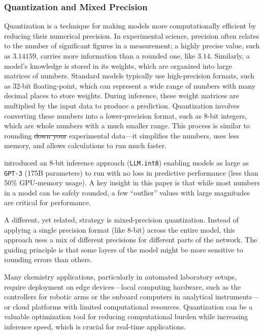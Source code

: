 \documentclass[11pt, oneside]{article}
\makeatletter
\newcommand{\modelname}[1]{\texttt{#1}}
\providecommand{\DIFdeltex}[1]{{\protect\color{red}\sout{#1}}} %
\providecommand{\DIFdelbegin}{} %
\providecommand{\DIFdelend}{} %
\providecommand{\DIFdel}[1]{\texorpdfstring{\DIFdeltex{#1}}{}} %
\newcommand{\DIFscaledelfig}{0.5}
\newlength{\DIFdelgraphicswidth} %
\newlength{\DIFdelgraphicsheight} %
\newcommand{\DIFdelincludegraphics}[2][]{%
\sbox{\DIFdelgraphicsbox}{\DIFOincludegraphics[#1]{#2}}%
\settoboxwidth{\DIFdelgraphicswidth}{\DIFdelgraphicsbox} %
\settoboxtotalheight{\DIFdelgraphicsheight}{\DIFdelgraphicsbox} %
\scalebox{\DIFscaledelfig}{%
\parbox[b]{\DIFdelgraphicswidth}{\usebox{\DIFdelgraphicsbox}\\[-\baselineskip] \rule{\DIFdelgraphicswidth}{0em}}\llap{\resizebox{\DIFdelgraphicswidth}{\DIFdelgraphicsheight}{%
\setlength{\unitlength}{\DIFdelgraphicswidth}%
\begin{picture}(1,1)%
\thicklines\linethickness{2pt} %
{\color[rgb]{1,0,0}\put(0,0){\framebox(1,1){}}}%
{\color[rgb]{1,0,0}\put(0,0){\line( 1,1){1}}}%
{\color[rgb]{1,0,0}\put(0,1){\line(1,-1){1}}}%
\end{picture}%
}\hspace*{3pt}}} %
} %
\DeclareRobustCommand{\DIFdelbegin}{\DIFOdelbegin \let\includegraphics\DIFdelincludegraphics} %
\DeclareRobustCommand{\DIFdelend}{\DIFOaddend \let\includegraphics\DIFOincludegraphics} %
\let\sout@orig\sout %
\renewcommand{\sout}[1]{\ifmmode\text{\sout@orig{\ensuremath{#1}}}\else\sout@orig{#1}\fi} %
\makeatother
\begin{document}
\subsubsection{Quantization and Mixed Precision}
\label{sec:quantization}
Quantization is a technique for making models more computationally efficient by reducing their numerical precision. 
In experimental science, precision often relates to the number of significant figures in a measurement; a highly precise value, such as $3.14159$, carries more information than a rounded one, like $3.14$. 
Similarly, a model's knowledge is stored in its weights, which are organized into large matrices of numbers. 
Standard models typically use high-precision formats, such as 32-bit floating-point, which can represent a wide range of numbers with many decimal places to store weights. During inference, these weight matrices are multiplied by the input data to produce a prediction. Quantization involves converting these numbers into a lower-precision format, such as 8-bit integers, which are whole numbers with a much smaller range. This process is similar to rounding \DIFdelbegin \DIFdel{down your }\DIFdelend experimental data---it simplifies the numbers, uses less memory, and allows calculations to run much faster.

 
\textcite{dettmers2022gpt3} introduced an 8-bit inference approach (\texttt{LLM.int8}) enabling models as large as \modelname{GPT-3} (175B parameters) to run with no loss in predictive performance (less than $50\%$ GPU-memory usage).  
A key insight in this paper is that while most numbers in a model can be safely rounded, a few \enquote{outlier} values with large magnitudes are critical for performance. 

A different, yet related, strategy is mixed-precision quantization.\autocite{micikevicius2017mixed} Instead of applying a single precision format (like 8-bit) across the entire model, this approach uses a mix of different precisions for different parts of the network. The guiding principle is that some layers of the model might be more sensitive to rounding errors than others.


Many chemistry applications, particularly in automated laboratory setups, require deployment on edge devices---local computing hardware, such as the controllers for robotic arms or the onboard computers in analytical instruments---or cloud platforms with limited computational resources. Quantization can be a valuable optimization tool for reducing computational burden while increasing inference speed, which is crucial for real-time applications.
\end{document}
